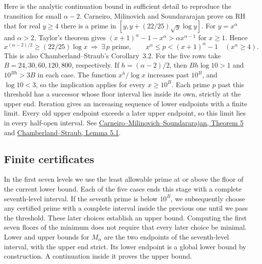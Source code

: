 Here is the analytic continuation bound in sufficient detail to reproduce the transition for small $\alpha-2$. Carneiro, Milinovich and Soundararajan prove on RH that for real $y\ge4$ there is a prime in $[y,y+(22/25)\sqrt y\log y]$. For $y=x^\alpha$ and $\alpha>2$, Taylor's theorem gives
$(x+1)^\alpha-1-x^\alpha>\alpha x^{\alpha-1}$ for $x\ge1$. Hence
\[
 x^{(\alpha-2)/2}\ge (22/25)\log x
 \ \Longrightarrow\ 
 \exists\,p\text{ prime},\qquad x^\alpha\le p<(x+1)^\alpha-1
 \quad (x^\alpha\ge4).
\]
This is also Chamberland--Straub's Corollary~3.2. For the five rows take $B=24,30,60,120,800$, respectively. If $h=(\alpha-2)/2$, then $Bh\log 10>1$ and $10^{Bh}>3B$ in each case. The function $x^h/\log x$ increases past $10^B$, and $\log 10<3$, so the implication applies for every $x\ge10^B$. Each prime $p$ past this threshold has a successor whose floor interval lies inside its own, strictly at the upper end. Iteration gives an increasing sequence of lower endpoints with a finite limit. Every old upper endpoint exceeds a later upper endpoint, so this limit lies in every half-open interval. See \href{https://arxiv.org/abs/1708.04122}{Carneiro--Milinovich--Soundararajan, Theorem 5} and \href{https://arxiv.org/html/2602.22502v1}{Chamberland--Straub, Lemma 5.1}.

\subsection{Finite certificates}
In the first seven levels we use the least allowable prime at or above the floor of the current lower bound. Each of the five cases ends this stage with a complete seventh-level interval. If the seventh prime is below $10^B$, we subsequently choose any certified prime with a complete interval inside the previous one until we pass the threshold. These later choices establish an upper bound. Computing the first seven floors of the minimum does not require that every later choice be minimal. Lower and upper bounds for $M_\alpha$ are the two endpoints of the seventh-level interval, with the upper end strict. Its lower endpoint is a global lower bound by construction. A continuation inside it proves the upper bound.

